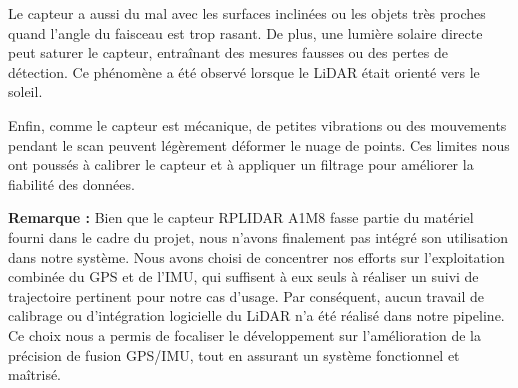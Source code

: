 Le capteur a aussi du mal avec les surfaces inclinées ou les objets très proches quand l’angle du faisceau est trop rasant. De plus, une lumière solaire directe peut saturer le capteur, entraînant des mesures fausses ou des pertes de détection. Ce phénomène a été observé lorsque le LiDAR était orienté vers le soleil.

\vspace{1em}

Enfin, comme le capteur est mécanique, de petites vibrations ou des mouvements pendant le scan peuvent légèrement déformer le nuage de points. Ces limites nous ont poussés à calibrer le capteur et à appliquer un filtrage pour améliorer la fiabilité des données.

\vspace{2em}

\vspace{1em}

\textbf{Remarque :} Bien que le capteur RPLIDAR A1M8 fasse partie du matériel fourni dans le cadre du projet, nous n’avons finalement pas intégré son utilisation dans notre système. Nous avons choisi de concentrer nos efforts sur l’exploitation combinée du GPS et de l’IMU, qui suffisent à eux seuls à réaliser un suivi de trajectoire pertinent pour notre cas d’usage. Par conséquent, aucun travail de calibrage ou d’intégration logicielle du LiDAR n’a été réalisé dans notre pipeline. Ce choix nous a permis de focaliser le développement sur l’amélioration de la précision de fusion GPS/IMU, tout en assurant un système fonctionnel et maîtrisé.

